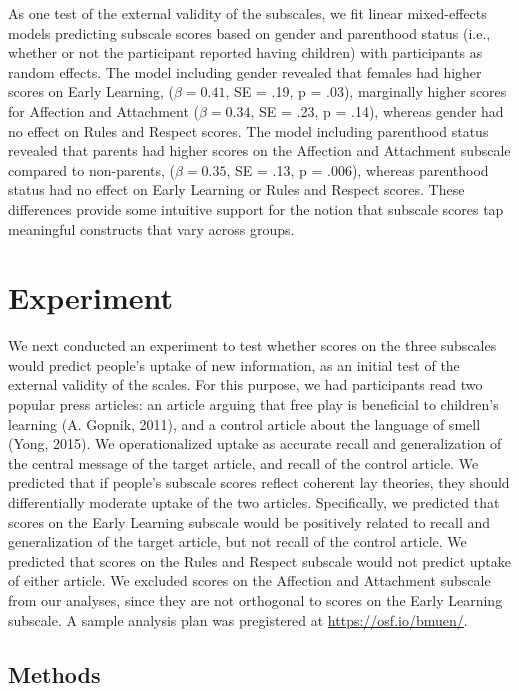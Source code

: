 \documentclass[10pt, letterpaper]{article}
\begin{document}
As one test of the external validity of the subscales, we fit linear
mixed-effects models predicting subscale scores based on gender and
parenthood status (i.e., whether or not the participant reported having
children) with participants as random effects. The model including
gender revealed that females had higher scores on Early Learning,
(\(\beta = 0.41\), SE = .19, p = .03), marginally higher scores for
Affection and Attachment (\(\beta = 0.34\), SE = .23, p = .14), whereas
gender had no effect on Rules and Respect scores. The model including
parenthood status revealed that parents had higher scores on the
Affection and Attachment subscale compared to non-parents,
(\(\beta = 0.35\), SE = .13, p = .006), whereas parenthood status had no
effect on Early Learning or Rules and Respect scores. These differences
provide some intuitive support for the notion that subscale scores tap
meaningful constructs that vary across groups.

\section{Experiment}\label{experiment}

We next conducted an experiment to test whether scores on the three
subscales would predict people's uptake of new information, as an
initial test of the external validity of the scales. For this purpose,
we had participants read two popular press articles: an article arguing
that free play is beneficial to children's learning (A. Gopnik, 2011),
and a control article about the language of smell (Yong, 2015). We
operationalized uptake as accurate recall and generalization of the
central message of the target article, and recall of the control
article. We predicted that if people's subscale scores reflect coherent
lay theories, they should differentially moderate uptake of the two
articles. Specifically, we predicted that scores on the Early Learning
subscale would be positively related to recall and generalization of the
target article, but not recall of the control article. We predicted that
scores on the Rules and Respect subscale would not predict uptake of
either article. We excluded scores on the Affection and Attachment
subscale from our analyses, since they are not orthogonal to scores on
the Early Learning subscale. A sample analysis plan was pregistered at
\url{https://osf.io/bmuen/}.

\subsection{Methods}\label{methods}
\end{document}
